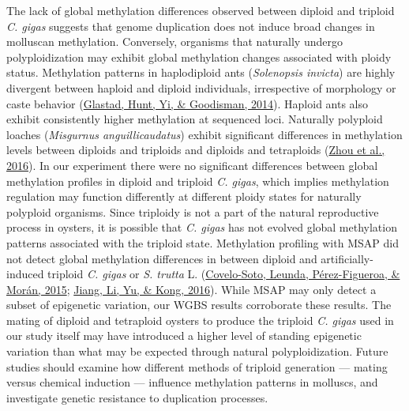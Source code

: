 \documentclass [11pt, proquest] {uwthesis}[2015/03/03]
\begin{document}
The lack of global methylation differences observed between diploid and triploid \emph{C. gigas} suggests that genome duplication does not induce broad changes in molluscan methylation. Conversely, organisms that naturally undergo polyploidization may exhibit global methylation changes associated with ploidy status. Methylation patterns in haplodiploid ants (\emph{Solenopsis invicta}) are highly divergent between haploid and diploid individuals, irrespective of morphology or caste behavior (\protect\hyperlink{ref-Glastad2014}{Glastad, Hunt, Yi, \& Goodisman, 2014}). Haploid ants also exhibit consistently higher methylation at sequenced loci. Naturally polyploid loaches (\emph{Misgurnus anguillicaudatus}) exhibit significant differences in methylation levels between diploids and triploids and diploids and tetraploids (\protect\hyperlink{ref-Zhou2016}{Zhou et al., 2016}). In our experiment there were no significant differences between global methylation profiles in diploid and triploid \emph{C. gigas}, which implies methylation regulation may function differently at different ploidy states for naturally polyploid organisms. Since triploidy is not a part of the natural reproductive process in oysters, it is possible that \emph{C. gigas} has not evolved global methylation patterns associated with the triploid state. Methylation profiling with MSAP did not detect global methylation differences in between diploid and artificially-induced triploid \emph{C. gigas} or \emph{S. trutta} L. (\protect\hyperlink{ref-Covelo-Soto2015}{Covelo-Soto, Leunda, Pérez-Figueroa, \& Morán, 2015}; \protect\hyperlink{ref-Jiang2016}{Jiang, Li, Yu, \& Kong, 2016}). While MSAP may only detect a subset of epigenetic variation, our WGBS results corroborate these results. The mating of diploid and tetraploid oysters to produce the triploid \emph{C. gigas} used in our study itself may have introduced a higher level of standing epigenetic variation than what may be expected through natural polyploidization. Future studies should examine how different methods of triploid generation --- mating versus chemical induction --- influence methylation patterns in molluscs, and investigate genetic resistance to duplication processes.
\end{document}

